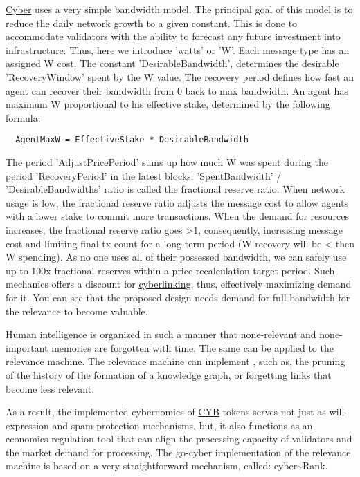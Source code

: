 \documentclass[8pt,oneside]{amsart}
\newcommand{\linkgreen}[2]{\href{#1}{\color{green}{#2}}}
\newcommand{\code}[1]{{\PlayBold #1}}
\begin{document}
{\hyperref[cyber]{Cyber}} uses a very simple bandwidth model. The principal goal of this model is to reduce the daily network growth to a given constant. This is done to accommodate validators with the ability to forecast any future investment into infrastructure. Thus, here we introduce 'watts' or 'W'. Each message type has an assigned W cost. The constant 'DesirableBandwidth', determines the desirable 'RecoveryWindow' spent by the W value. The recovery period defines how fast an agent can recover their bandwidth from 0 back to max bandwidth. An agent has maximum W proportional to his effective stake, determined by the following formula:
\begin{lstlisting}
  AgentMaxW = EffectiveStake * DesirableBandwidth
\end{lstlisting}

The period 'AdjustPricePeriod' sums up how much W was spent during the period 'RecoveryPeriod' in the latest blocks. 'SpentBandwidth' / 'DesirableBandwidths' ratio is called the fractional reserve ratio. When network usage is low, the fractional reserve ratio adjusts the message cost to allow agents with a lower stake to commit more transactions. When the demand for resources increases, the fractional reserve ratio goes \code{>1}, consequently, increasing message cost and limiting final tx count for a long-term period (W recovery will be \code{<} then W spending). As no one uses all of their possessed bandwidth, we can safely use up to 100x fractional reserves within a price recalculation target period. Such mechanics offers a discount for {\hyperref[cyberlinks]{cyberlinking}}, thus, effectively maximizing demand for it. You can see that the proposed design needs demand for full bandwidth for the relevance to become valuable.

Human intelligence is organized in such a manner that none-relevant and none-important memories are forgotten with time. The same can be applied to the relevance machine. The relevance machine can implement \linkgreen{https://ipfs.io/ipfs/QmP81EcuNDZHQutvdcDjbQEqiTYUzU315aYaTyrVj6gtJb}{aggressive pruning strategies}, such as, the pruning of the history of the formation of a {\hyperref[knowledge-graph]{knowledge graph}}, or forgetting links that become less relevant.

As a result, the implemented cybernomics of {\hyperref[cyb]{CYB}} tokens serves not just as will-expression and spam-protection mechanisms, but, it also functions as an economics regulation tool that can align the processing capacity of validators and the market demand for processing. The go-cyber implementation of the relevance machine is based on a very straightforward mechanism, called: cyber\~{}Rank.
\end{document}
